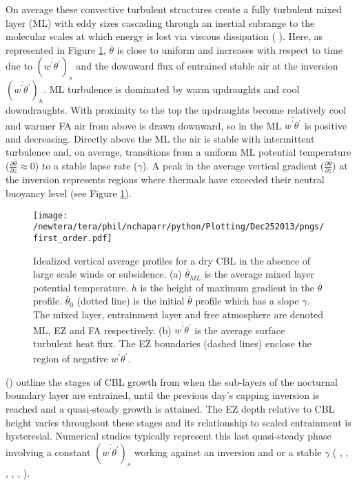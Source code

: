 On average these convective turbulent structures create a fully turbulent mixed layer (\acs{ML}) with eddy sizes cascading through an inertial subrange to the molecular scales at which energy is lost via viscous dissipation (\citeauthor{Stull-BLMetIntro} \citeyear{Stull-BLMetIntro}).  Here, as represented in Figure \ref{fig:1storder}, $\overline{\theta}$ is close to uniform and increases with respect to time due to $(\overline{w^{'}\theta^{'}})_{s}$ and the downward flux of entrained stable air at the inversion $(\overline{w^{'}\theta^{'}})_{h}$.  \acs{ML} turbulence is dominated by warm updraughts and cool downdraughts.  With proximity to the top the updraughts become relatively cool and warmer \acs{FA} air from above is drawn downward, so in the \acs{ML} $\overline{w^{'}\theta^{'}}$ is positive and decreasing.  Directly above the \acs{ML} the air is stable with intermittent turbulence and, on average, transitions from a uniform \acs{ML} potential temperature ($\frac{\partial \overline{\theta}}{\partial z} \approx 0$) to a stable lapse rate ($\gamma$).  A peak in the average vertical gradient ($\frac{\partial \overline{\theta}}{\partial z}$) at the inversion represents regions where thermals have exceeded their neutral buoyancy level (see Figure \ref{fig:1storder}).\\

\begin{figure}[htbp]
    \centering
    \texttt{[image: /newtera/tera/phil/nchaparr/python/Plotting/Dec252013/pngs/first\_order.pdf]}
    \caption[Idealized vertical average profiles for a dry \acs{CBL}]{Idealized vertical average profiles for a dry \acs{CBL} in the absence of large scale winds or subsidence. (a) $\overline{\theta}_{ML}$ is the average mixed layer potential temperature. $h$ is the height of maximum gradient in the $\overline{\theta}$ profile. $\overline{\theta}_{0}$ (dotted line) is the initial $\overline{\theta}$ profile which has a slope $\gamma$. The mixed layer, entrainment layer and free atmosphere are denoted \acs{ML}, \acs{EZ} and \acs{FA} respectively.  (b) $\overline{w^{'}\theta^{'}}$ is the average surface turbulent heat flux.  The EZ boundaries (dashed lines) enclose the region of negative $\overline{w^{'}\theta^{'}}$.}
    \label{fig:1storder}   %
\end{figure}

\citeauthor{StullNelEl} (\citeyear{StullNelEl}) outline the stages of \acs{CBL} growth from when the sub-layers of the nocturnal boundary layer are entrained, until the previous day's capping inversion is reached and a quasi-steady growth is attained.  The \acs{EZ} depth relative to \acs{CBL} height varies throughout these stages and its relationship to scaled entrainment is hysteresial.  Numerical studies typically represent this last quasi-steady phase involving a constant $(\overline{w^{'}\theta^{'}})_{s}$ working against an inversion and or a stable $\gamma$ (\citeauthor{SchmidtSchu} \citeyear{SchmidtSchu}, \citeauthor{Sorbjan} \citeyear{Sorbjan}, \citeauthor{SullMoengStev} \citeyear{SullMoengStev}, \citeauthor{FedConzMir04} \citeyear{FedConzMir04}, \citeauthor{BrooksFowler2} \citeyear{BrooksFowler2}, \citeauthor{GarciaMellado} \citeyear{GarciaMellado}).  

